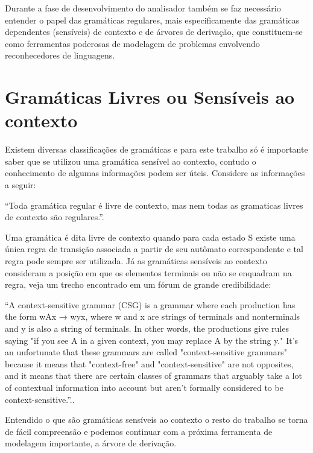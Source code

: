 \documentclass[12pt,a4paper,oneside,english,brazilian,brazil]{abntex2}
\begin{document}
\par Durante a fase de desenvolvimento do analisador também se faz necessário entender o papel das gramáticas regulares, mais especificamente das gramáticas dependentes (sensíveis) de contexto e de árvores de derivação, que constituem-se como ferramentas poderosas de modelagem de problemas envolvendo reconhecedores de linguagens. \

\section{Gramáticas Livres ou Sensíveis ao contexto}

Existem diversas classificações de gramáticas e para este trabalho só é importante saber que se utilizou uma gramática sensível ao contexto, contudo o conhecimento de algumas informações podem ser úteis. Considere as informações a seguir:

\begin{citacao}
``Toda gramática regular é livre de contexto, mas nem todas as gramaticas livres de contexto são regulares.''\cite{wiki:glc}.
\end{citacao}

\par Uma gramática é dita livre de contexto quando para cada estado S existe uma única regra de transição associada a partir de seu autômato correspondente e tal regra pode sempre ser utilizada. Já as gramáticas sensíveis ao contexto consideram a posição em que os elementos terminais ou não se enquadram na regra, veja um trecho encontrado em um fórum de grande credibilidade: \

\begin{citacao}
``A context-sensitive grammar (CSG) is a grammar where each production has the form wAx → wyx, where w and x are strings of terminals and nonterminals and y is also a string of terminals. In other words, the productions give rules saying "if you see A in a given context, you may replace A by the string y." It's an unfortunate that these grammars are called "context-sensitive grammars" because it means that "context-free" and "context-sensitive" are not opposites, and it means that there are certain classes of grammars that arguably take a lot of contextual information into account but aren't formally considered to be context-sensitive.''.\cite{sof:cfgVScsg}.
\end{citacao}

\par Entendido o que são gramáticas sensíveis ao contexto o resto do trabalho se torna de fácil compreensão e podemos continuar com a próxima ferramenta de modelagem importante, a árvore de derivação. \
\end{document}
